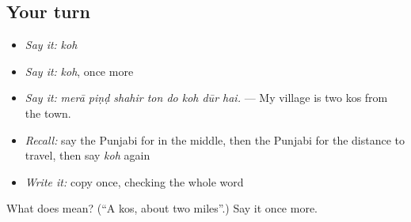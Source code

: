 \subsection*{Your turn}
\begin{itemize}
\raggedright
  \item \emph{Say it:} \emph{koh}
  \item \emph{Say it:} \emph{koh}, once more
  \item \emph{Say it:} \emph{merā piṇḍ shahir ton do koh dūr hai.} — My village is two kos from the town.
  \item \emph{Recall:} say the Punjabi for in the middle, then the Punjabi for the distance to travel, then say \emph{koh} again
  \item \emph{Write it:} copy \textbf{} once, checking the whole word
\end{itemize}

\begin{tcolorbox}[breakable,colback=teal!4,colframe=teal!35!black,title={Before you move on}]
What does  mean? (\textquotedblleft{}A kos, about two miles\textquotedblright{}.) Say it once more.
\end{tcolorbox}
